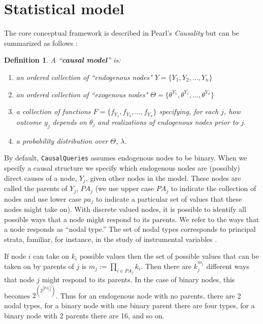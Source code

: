 \documentclass[
  11pt,
  article]{jss}
\newtheorem{definition}{Definition}
\begin{document}
\hypertarget{sec-theory}{%
\section{Statistical model}\label{sec-theory}}

The core conceptual framework is described in Pearl's \emph{Causality}
\citep{pearl_causality_2009} but can be summarized as follows
\citep[using notation from][]{humphreys_integrated_2023}:

\begin{definition}
  
  A ``\textbf{causal model}'' is:
  \begin{enumerate}
    \item an ordered collection of ``endogenous nodes" $Y = \{Y_1, Y_2, \dots, Y_n\}$
    \item an ordered collection of ``exogenous nodes" $\Theta = \{\theta^{Y_1}, \theta^{Y_1}, \dots, \theta^{Y_n}\}$
    \item a collection of functions $F = \{f_{Y_1}, f_{Y_2}, \dots, f_{Y_n}\}$ specifying, for each $j$, how outcome $y_j$ depends on $\theta_j$ and realizations of endogenous nodes prior to $j$.
    \item a probability distribution over $\Theta$, $\lambda$.
  \end{enumerate}
  
\end{definition}

By default, \texttt{CausalQueries} assumes endogenous nodes to be
binary. When we specify a causal structure we specify which endogenous
nodes are (possibly) direct causes of a node, \(Y_j\), given other nodes
in the model. These nodes are called the parents of \(Y_j\), \(PA_j\)
(we use upper case \(PA_j\) to indicate the collection of nodes and use
lower case \(pa_j\) to indicate a particular set of values that these
nodes might take on). With discrete valued nodes, it is possible to
identify all possible ways that a node might respond to its parents. We
refer to the ways that a node responds as ``nodal type.'' The set of
nodal types corresponds to principal strata, familiar, for instance, in
the study of instrumental variables \citep{frangakis_principal_2002}.

If node \(i\) can take on \(k_i\) possible values then the set of
possible values that can be taken on by parents of \(j\) is
\(m_j :=\prod_{i\in PA_j}k_i\). Then there are \(k_j^{m_j}\) different
ways that node \(j\) might respond to its parents. In the case of binary
nodes, this becomes \(2^{\left(2^{|PA_j|}\right)}\). Thus for an
endogenous node with no parents, there are 2 nodal types, for a binary
node with one binary parent there are four types, for a binary node with
2 parents there are 16, and so on.
\end{document}
